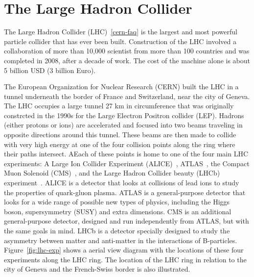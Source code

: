 \section{The Large Hadron Collider}
The Large Hadron Collider (LHC)~\ref{cern-faq} is the largest and most powerful particle collider that has ever been built. Construction of the LHC involved a collaboration of more than 10,000 scientist from more than 100 countries and was completed in 2008, after a decade of work. The cost of the machine alone is about 5 billion USD (3 billion Euro).

The European Organization for Nuclear Research (CERN) built the LHC in a tunnel underneath the border of France and Switzerland, near the city of Geneva. The LHC occupies a large tunnel 27 km in circumference that was originally constrcted in the 1990s for the Large Electron Positron collider (LEP). Hadrons (either protons or ions) are accelerated and focused into two beams traveling in opposite directions around this tunnel. These beams are then made to collide with very high energy at one of the four collision points along the ring where their paths intersect. AEach of these points is home to one of the four main LHC experiments: A Large Ion Collider
Experiment (ALICE)~\cite{cern-jinst-alice}, ATLAS~\cite{cern-jinst-atlas}, the Compact Muon Solenoid (CMS)~\cite{cern-jinst-cms}, and the Large Hadron Collider beauty (LHCb) experiment~\cite{cern-jinst-lhcb}. ALICE is a detector that looks at collisions of lead ions to study the properties of quark-gluon plasma. ATLAS is a general-purpose detector that looks for a wide range of possible new types of physics, including the Higgs boson, supersymmetry (SUSY) and extra dimensions. CMS is an additional general-purpose detector, designed and run independently from ATLAS, but with the same goals in mind. LHCb is a detector specially designed to study the asymmetry between matter and anti-matter in the interactions of B-particles. Figure~\ref{fig:lhc-exp} shows a aerial view diagram with the locations of these four experiments along the LHC ring. The location of the LHC ring in relation to the city of Geneva and the French-Swiss border is also illustrated.

